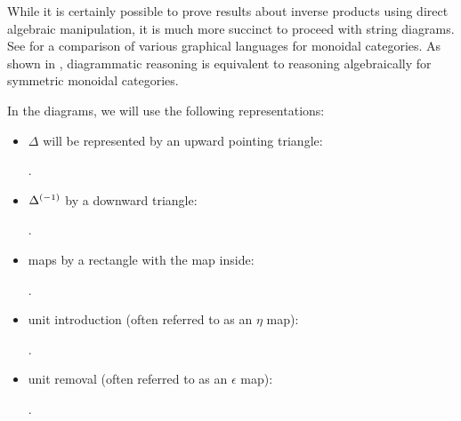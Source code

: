 While it is certainly possible to prove results about inverse products using direct algebraic
manipulation, it is much more succinct to proceed with string diagrams. See
\cite{selinger11:graphical} for a comparison of various graphical languages for monoidal categories.
As shown in
\cite{street-ross-1991-GTC-I}, diagrammatic reasoning is equivalent to reasoning algebraically for
symmetric monoidal categories.

In the diagrams, we will use the following representations:
\begin{itemize}
  \item $\Delta$ will be represented by an upward pointing triangle: .
  \item ${\Delta}^{(-1)}$ by a downward triangle: .
  \item maps by a rectangle with the map inside: .
  \item unit introduction (often referred to as an $\eta$ map): .
  \item unit removal (often referred to as an $\epsilon$ map): .
\end{itemize}

